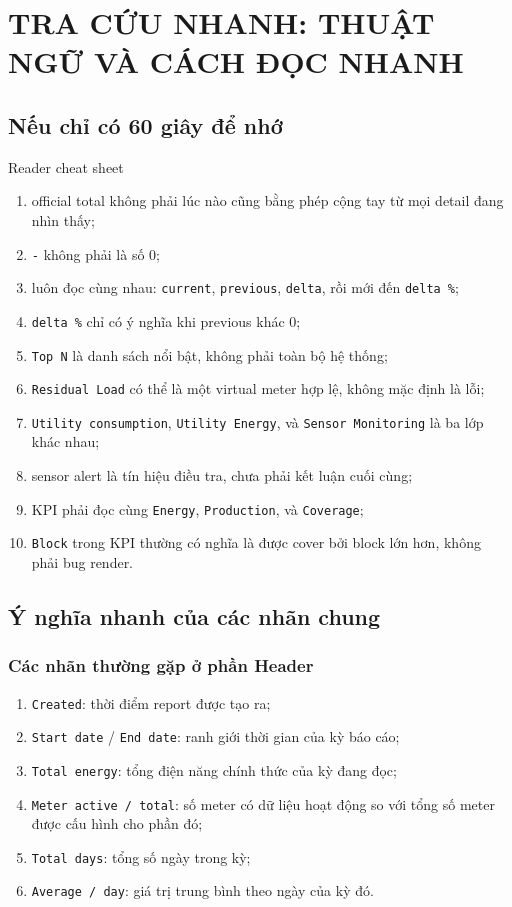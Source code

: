 \chapter{TRA CỨU NHANH: THUẬT NGỮ VÀ CÁCH ĐỌC NHANH}

\section{Nếu chỉ có 60 giây để nhớ}

\begin{ReaderNote}{Reader cheat sheet}
\begin{enumerate}[label=-]
\item official total không phải lúc nào cũng bằng phép cộng tay từ mọi detail đang nhìn thấy;
\item \texttt{-} không phải là số 0;
\item luôn đọc cùng nhau: \texttt{current}, \texttt{previous}, \texttt{delta}, rồi mới đến \texttt{delta \%};
\item \texttt{delta \%} chỉ có ý nghĩa khi previous khác 0;
\item \texttt{Top N} là danh sách nổi bật, không phải toàn bộ hệ thống;
\item \texttt{Residual Load} có thể là một virtual meter hợp lệ, không mặc định là lỗi;
\item \texttt{Utility consumption}, \texttt{Utility Energy}, và \texttt{Sensor Monitoring} là ba lớp khác nhau;
\item sensor alert là tín hiệu điều tra, chưa phải kết luận cuối cùng;
\item KPI phải đọc cùng \texttt{Energy}, \texttt{Production}, và \texttt{Coverage};
\item \texttt{Block} trong KPI thường có nghĩa là được cover bởi block lớn hơn, không phải bug render.
\end{enumerate}
\end{ReaderNote}

\section{Ý nghĩa nhanh của các nhãn chung}

\subsection{Các nhãn thường gặp ở phần Header}

\begin{enumerate}[label=-]
\item \texttt{Created}: thời điểm report được tạo ra;
\item \texttt{Start date} / \texttt{End date}: ranh giới thời gian của kỳ báo cáo;
\item \texttt{Total energy}: tổng điện năng chính thức của kỳ đang đọc;
\item \texttt{Meter active / total}: số meter có dữ liệu hoạt động so với tổng số meter được cấu hình cho phần đó;
\item \texttt{Total days}: tổng số ngày trong kỳ;
\item \texttt{Average / day}: giá trị trung bình theo ngày của kỳ đó.
\end{enumerate}

